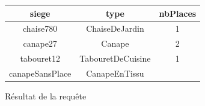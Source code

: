 \documentclass[a4paper,12pt]{article}
\begin{document}
\begin{figure}[H]
	\begin{center}
		\begin{tabular}{|c|c|c|} 
			\hline
			\textbf{siege} & \textbf{type} & \textbf{nbPlaces} \\
			\hline
			chaise780 & ChaiseDeJardin & 1 \\
			\hline
			canape27 & Canape & 2 \\
			\hline
			tabouret12 & TabouretDeCuisine & 1 \\
			\hline
			canapeSansPlace & CanapeEnTissu & \\
		\end{tabular}
	\end{center}
\caption{Résultat de la requête}
\end{figure}
\end{document}
